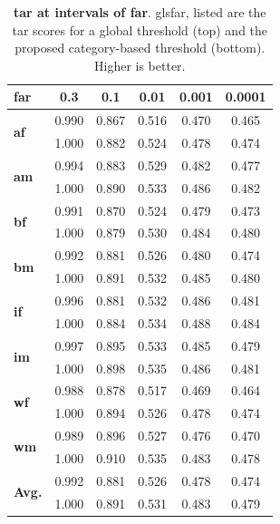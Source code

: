 \documentclass[10pt,twocolumn,letterpaper]{article}
\begin{document}
 
\begin{table}[b!]
\caption{\small{\textbf{\gls{tar} at intervals of \gls{far}}. gls{far}, listed are the \gls{tar} scores for a global threshold (top) and the proposed category-based threshold (bottom). Higher is better.}}\label{tab:ethnicy-far} 
\begin{center}
\scriptsize
\begin{tabular}{l c c c c c}
     \gls{far} & 0.3 & 0.1 & 0.01 & 0.001 & 0.0001\\\midrule
    \multirow{2}{.1mm}{\textbf{\gls{af}}} &0.990 & 0.867 & 0.516 & 0.470 & 0.465\\[-4pt]
        &1.000 & 0.882 & 0.524 & 0.478 & 0.474\\[-1pt]
    \multirow{2}{3mm}{\textbf{\gls{am}}} &0.994 & 0.883 & 0.529 & 0.482 & 0.477\\[-4pt]
        &1.000 & 0.890 & 0.533 & 0.486 & 0.482\\[-1pt]
    \multirow{2}{3mm}{\textbf{\gls{bf}}} &0.991 & 0.870 & 0.524 & 0.479 & 0.473\\[-4pt]
        &1.000 & 0.879 & 0.530 & 0.484 & 0.480\\[-1pt]
    \multirow{2}{3mm}{\textbf{\gls{bm}}} &0.992 & 0.881 & 0.526 & 0.480 & 0.474\\[-4pt]
        &1.000 & 0.891 & 0.532 & 0.485 & 0.480\\[-1pt]
    \multirow{2}{3mm}{\textbf{\gls{if}}} &0.996 & 0.881 & 0.532 & 0.486 & 0.481\\[-4pt]
        &1.000 & 0.884 & 0.534 & 0.488 & 0.484\\[-1pt]
    \multirow{2}{3mm}{\textbf{\gls{im}}} &0.997 & 0.895 & 0.533 & 0.485 & 0.479\\[-4pt]
        &1.000 & 0.898 & 0.535 & 0.486 & 0.481\\[-1pt]
    \multirow{2}{3mm}{\textbf{\gls{wf}}} &0.988 & 0.878 & 0.517 & 0.469 & 0.464\\[-4pt]
        &1.000 & 0.894 & 0.526 & 0.478 & 0.474\\[-1pt]
    \multirow{2}{3mm}{\textbf{\gls{wm}}} &0.989 & 0.896 & 0.527 & 0.476 & 0.470\\[-4pt]
        &1.000 & 0.910 & 0.535 & 0.483 & 0.478\\[-1pt]
    \midrule
    \multirow{2}{3mm}{\textbf{Avg.}} &0.992 & 0.881 & 0.526 & 0.478 & 0.474\\[-4pt]
        &1.000 & 0.891 & 0.531 & 0.483 & 0.479\\[-10pt]
\end{tabular}
\end{center}

\end{table}
\end{document}
